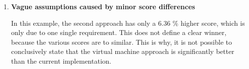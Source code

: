 \begin{enumerate}
	\item \textbf{Vague assumptions caused by minor score differences}
	
	In this example, the second approach has only a 6.36 \% higher score, which is only due to one single requirement.
	This does not define a clear winner, because the various scores are to similar.
	This is why, it is not possible to conclusively state that the virtual machine approach is significantly better than the current implementation.
	
\end{enumerate}









